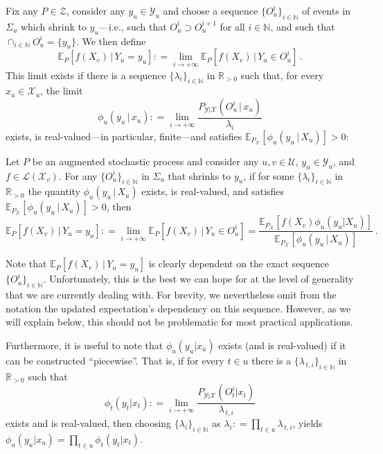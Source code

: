 \documentclass[twoside,11pt]{article}
\newcommand{\nats}{\mathbb{N}}
\newcommand{\reals}{\mathbb{R}}
\newcommand{\realspos}{\reals_{>0}}
\newcommand{\states}{\mathcal{X}}
\newcommand{\observs}{\mathcal{Y}}
\newcommand{\gambles}{\mathcal{L}}
\newcommand{\coloneqq}{:\!=}
\begin{document}
Fix any $P\in\mathcal{Z}$, consider any $y_u\in\observs_u$ and choose a sequence $\{O_u^i\}_{i\in\nats}$ of events in $\Sigma_u$ which shrink to $y_u$---i.e., such that $O_u^i\supset O_u^{i+1}$ for all $i\in\nats$, and such that $\cap_{i\in\nats} O_u^i=\{y_u\}$. We then define
\begin{equation}\label{eq:def:precise_updated_limit}
\mathbb{E}_P[f(X_v)\,\vert\,Y_u=y_u] \coloneqq \lim_{i\to+\infty} \mathbb{E}_P[f(X_v)\,\vert\,Y_u\in O_u^i]\,.
\end{equation}
This limit exists if there is a sequence $\{\lambda_i\}_{i\in\nats}$ in $\realspos$ such that, for every $x_u\in\states_u$, the limit
\begin{equation*}
\phi_u(y_u\,\vert\, x_u) \coloneqq \lim_{i\to+\infty}\frac{P_{\observs\vert\states}(O_u^i\,\vert\, x_u)}{\lambda_i}
\end{equation*}
exists, is real-valued---in particular, finite---and satisfies $\mathbb{E}_{P_\states}[\phi_u(y_u\,\vert\,X_u)]>0$:
\begin{proposition}\label{prop:precise_bayes_rule_densities}
Let $P$ be an augmented stochastic process and consider any $u,v\in\mathcal{U}$, $y_u\in\observs_u$, and $f\in\gambles(\states_v)$. For any $\{O_u^i\}_{i\in\nats}$ in $\Sigma_u$ that shrinks to $y_u$, if for some $\{\lambda_i\}_{i\in\nats}$ in $\realspos$ the quantity $\phi_u(y_u\,\vert\,X_u)$ exists, is real-valued, and satisfies $\mathbb{E}_{P_\states}[\phi_u(y_u\,\vert\,X_u)]>0$, then
\begin{equation}\label{eq:updated_expectation_is_limit}
\mathbb{E}_P[f(X_v)\,\vert\,Y_u=y_u] \coloneqq \lim_{i\to+\infty} \mathbb{E}_P[f(X_v)\,\vert\,Y_u\in O_u^i] = \frac{\mathbb{E}_{P_\states}[f(X_v)\phi_u(y_u\vert X_u)]}{\mathbb{E}_{P_\states}[\phi_u(y_u\,\vert\,X_u)]}\,.
\end{equation}
\end{proposition}
Note that $\mathbb{E}_P[f(X_v)\,\vert\,Y_u=y_u]$ is clearly dependent on the exact sequence $\{O_u^i\}_{i\in\nats}$. Unfortunately, this is the best we can hope for at the level of generality that we are currently dealing with. %
For brevity, we nevertheless omit from the notation the updated expectation's dependency on this sequence. However, as we will explain below, this should not be problematic for most practical applications.

Furthermore, it is useful to note that $\phi_u(y_u\vert x_u)$ exists (and is real-valued) if it can be constructed ``piecewise''. That is, if for every $t\in u$ there is a $\{\lambda_{\,t,i}\}_{i\in\nats}$ in $\realspos$ such that
\begin{equation*}
\phi_t(y_t\vert x_t)\coloneqq \lim_{i\to+\infty} \frac{P_{\observs\vert\states}(O_t^i\vert x_t)}{\lambda_{\,t,i}}
\end{equation*}
exists and is real-valued, then choosing $\{\lambda_i\}_{i\in\nats}$ as $\lambda_i\coloneqq \prod_{t\in u}\lambda_{\,t,i}$, yields $\phi_u(y_u\vert x_u)=\prod_{t\in u}\phi_t(y_t\vert x_t)$.
\end{document}
